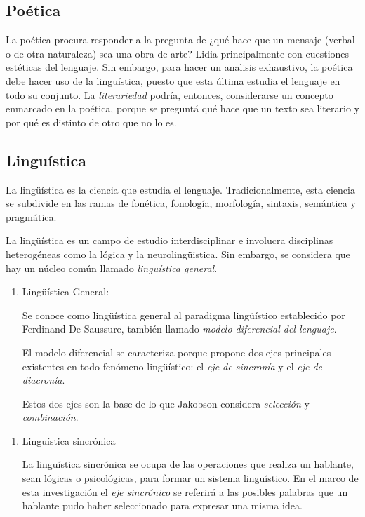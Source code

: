 \documentclass[twoside]{article}
\begin{document}
\subsection{Poética}
\label{sec:orgb25804e}
La poética procura responder a la pregunta de ¿qué hace que un
mensaje (verbal o de otra naturaleza) sea una obra de arte? Lidia
principalmente con cuestiones estéticas del lenguaje. Sin embargo,
para hacer un analisis exhaustivo, la poética debe hacer uso de la
linguística, puesto que esta última estudia el lenguaje en todo su
conjunto. La \emph{literariedad} podría, entonces, considerarse un
concepto enmarcado en la poética, porque se preguntá qué hace que
un texto sea literario y por qué es distinto de otro que no lo es.

\subsection{Linguística}
\label{sec:orgd43047c}



La lingüística es la ciencia que estudia el lenguaje.
Tradicionalmente, esta ciencia se subdivide en las ramas de fonética,
fonología, morfología, sintaxis, semántica y pragmática.

La lingüística es un campo de estudio interdisciplinar e involucra
disciplinas heterogéneas como la lógica y la neurolingüistica. Sin
embargo, se considera que hay un núcleo común llamado \emph{linguística
general}.

\begin{enumerate}
\item Lingüística General:

Se conoce como lingüística general al paradigma lingüístico
establecido por Ferdinand De Saussure, también llamado \emph{modelo
diferencial del lenguaje}.

El modelo diferencial se caracteriza porque propone dos ejes
principales existentes en todo fenómeno lingüístico: el \emph{eje de
sincronía} y el \emph{eje de diacronía}.

Estos dos ejes son la base de lo que Jakobson considera \emph{selección} y
\emph{combinación}.
\end{enumerate}


\begin{enumerate}
\item Linguística sincrónica

La linguística sincrónica se ocupa de las
operaciones que realiza un hablante, sean lógicas o psicológicas,
para formar un sistema linguístico. En el
marco de esta investigación el \emph{eje sincrónico} se referirá a las
posibles palabras que un hablante pudo haber seleccionado para
expresar una misma idea.
\end{enumerate}
\end{document}
